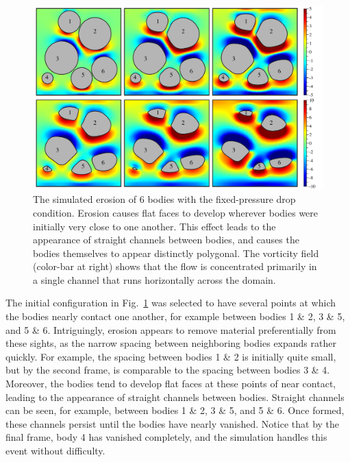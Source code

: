 \documentclass[preprint, 10pt]{elsarticle}
\begin{document}
\begin{figure}%
\begin{center}
\includegraphics[width = 0.80 \textwidth]{./figs/06bod.pdf}
\caption{\label{fig:06bodies} The simulated erosion of 6 bodies with the fixed-pressure drop condition. Erosion causes flat faces to develop wherever bodies were initially very close to one another. This effect leads to the appearance of straight channels between bodies, and causes the bodies themselves to appear distinctly polygonal. The vorticity field (color-bar at right) shows that the flow is concentrated primarily in a single channel that runs horizontally across the domain. }
\end{center}
\end{figure}

The initial configuration in  Fig.~\ref{fig:06bodies} was selected to have several points at which the bodies nearly contact one another, for example between bodies 1 \& 2, 3 \& 5, and 5 \& 6. Intriguingly, erosion appears to remove material preferentially from these sights, as the narrow spacing between neighboring bodies expands rather quickly. For example, the spacing between bodies 1 \& 2 is initially quite small, but by the second frame, is comparable to the spacing between bodies 3 \& 4. Moreover, the bodies tend to develop flat faces at these points of near contact, leading to the appearance of straight channels between bodies. Straight channels can be seen, for example, between bodies 1 \& 2, 3 \& 5, and 5 \& 6. Once formed, these channels persist until the bodies have nearly vanished. Notice that by the final frame, body 4 has vanished completely, and the simulation handles this event without difficulty.
\end{document}
